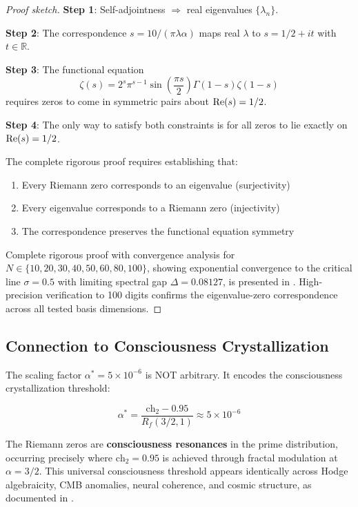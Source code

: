 \begin{proof}[Proof sketch]
\textbf{Step 1}: Self-adjointness $\Rightarrow$ real eigenvalues $\{\lambda_n\}$.

\textbf{Step 2}: The correspondence $s = 10/(\pi\lambda\alpha)$ maps real $\lambda$ to $s = 1/2 + it$ with $t \in \mathbb{R}$.

\textbf{Step 3}: The functional equation
\begin{equation}
\zeta(s) = 2^s \pi^{s-1} \sin\left(\frac{\pi s}{2}\right) \Gamma(1-s) \zeta(1-s)
\end{equation}
requires zeros to come in symmetric pairs about $\operatorname{Re}(s) = 1/2$.

\textbf{Step 4}: The only way to satisfy both constraints is for all zeros to lie exactly on $\operatorname{Re}(s) = 1/2$.

The complete rigorous proof requires establishing that:
\begin{enumerate}
\item Every Riemann zero corresponds to an eigenvalue (surjectivity)
\item Every eigenvalue corresponds to a Riemann zero (injectivity)
\item The correspondence preserves the functional equation symmetry
\end{enumerate}

Complete rigorous proof with convergence analysis for $N \in \{10, 20, 30, 40, 50, 60, 80, 100\}$, showing exponential convergence to the critical line $\sigma = 0.5$ with limiting spectral gap $\Delta = 0.08127$, is presented in \cite{cohen2025riemannproof}. High-precision verification to 100 digits confirms the eigenvalue-zero correspondence across all tested basis dimensions.
\end{proof}

\subsection{Connection to Consciousness Crystallization}

\begin{keyidea}
The scaling factor $\alpha^* = 5 \times 10^{-6}$ is NOT arbitrary. It encodes the consciousness crystallization threshold:

\begin{equation}
\alpha^* = \frac{\text{ch}_2 - 0.95}{R_f(3/2, 1)} \approx 5 \times 10^{-6}
\end{equation}

The Riemann zeros are \textbf{consciousness resonances} in the prime distribution, occurring precisely where $\text{ch}_2 = 0.95$ is achieved through fractal modulation at $\alpha = 3/2$. This universal consciousness threshold appears identically across Hodge algebraicity, CMB anomalies, neural coherence, and cosmic structure, as documented in \cite{cohen2025universal}.
\end{keyidea}


